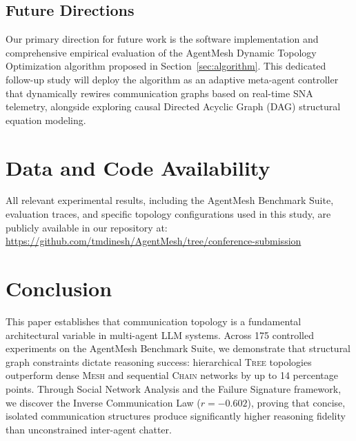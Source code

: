 \documentclass[conference]{IEEEtran}
\newcommand{\topo}[1]{\textsc{#1}}  %
\begin{document}
\subsection{Future Directions}
Our primary direction for future work is the software implementation and comprehensive empirical evaluation of the AgentMesh Dynamic Topology Optimization algorithm proposed in Section~\ref{sec:algorithm}. This dedicated follow-up study will deploy the algorithm as an adaptive meta-agent controller that dynamically rewires communication graphs based on real-time SNA telemetry, alongside exploring causal Directed Acyclic Graph (DAG) structural equation modeling.

\section{Data and Code Availability}
\label{sec:data_availability}

All relevant experimental results, including the AgentMesh Benchmark Suite, evaluation traces, and specific topology configurations used in this study, are publicly available in our repository at: \\
\url{https://github.com/tmdinesh/AgentMesh/tree/conference-submission}

\section{Conclusion}
\label{sec:conclusion}

This paper establishes that communication topology is a fundamental architectural variable in multi-agent LLM systems. Across 175 controlled experiments on the AgentMesh Benchmark Suite, we demonstrate that structural graph constraints dictate reasoning success: hierarchical \topo{Tree} topologies outperform dense \topo{Mesh} and sequential \topo{Chain} networks by up to 14 percentage points. Through Social Network Analysis and the Failure Signature framework, we discover the Inverse Communication Law ($r = -0.602$), proving that concise, isolated communication structures produce significantly higher reasoning fidelity than unconstrained inter-agent chatter.

\end{document}
